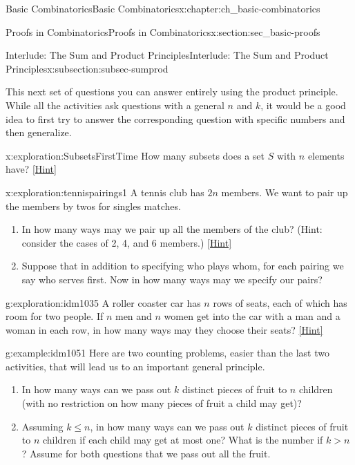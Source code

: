 \documentclass[oneside,10pt,]{book}
\numberwithin{equation}{chapter}
\newcommand{\gt}{>}
\begin{document}
\begin{chapterptx}{Basic Combinatorics}{}{Basic Combinatorics}{}{}{x:chapter:ch_basic-combinatorics}
\begin{sectionptx}{Proofs in Combinatorics}{}{Proofs in Combinatorics}{}{}{x:section:sec_basic-proofs}
\begin{subsectionptx}{Interlude: The Sum and Product Principles}{}{Interlude: The Sum and Product Principles}{}{}{x:subsection:subsec-sumprod}
\par
This next set of questions you can answer entirely using the product principle.  While all the activities ask questions with a general \(n\) and \(k\), it would be a good idea to first try to answer the corresponding question with specific numbers and then generalize.%
\begin{exploration}{}{x:exploration:SubsetsFirstTime}%
How many subsets does a set \(S\) with \(n\) elements have?%
\space\hspace*{0pt}\hfill{\tiny\hyperlink{g:hint:idm1006-back}{[Hint]}}\end{exploration}
\begin{exploration}{}{x:exploration:tennispairings1}%
A tennis club has \(2n\) members. We want to pair up the members by twos for singles matches.%
\begin{enumerate}[font=\bfseries,label=(\alph*),ref=\alph*]
\item{}In how many ways may we pair up all the members of the club? (Hint: consider the cases of 2, 4, and 6 members.)%
\space\hspace*{0pt}\hfill{\tiny\hyperlink{g:hint:idm1023-back}{[Hint]}}\item{}Suppose that in addition to specifying who plays whom, for each pairing we say who serves first.  Now in how many ways may we specify our pairs?%
\end{enumerate}
\end{exploration}
\begin{exploration}{}{g:exploration:idm1035}%
A roller coaster car has \(n\) rows of seats, each of which has room for two people. If \(n\) men and \(n\) women get into the car with a man and a woman in each row, in how many ways may they choose their seats?%
\space\hspace*{0pt}\hfill{\tiny\hyperlink{g:hint:idm1041-back}{[Hint]}}\end{exploration}
\begin{example}{}{g:example:idm1051}%
Here are two counting problems, easier than the last two activities, that will lead us to an important general principle.%
\begin{enumerate}
\item{}In how many ways can we pass out \(k\) distinct pieces of fruit to \(n\) children (with no restriction on how many pieces of fruit a child may get)?%
\item{}Assuming \(k\le n\), in how many ways can we pass out \(k\) distinct pieces of fruit to \(n\) children if each child may get at most one? What is the number if \(k \gt n\)? Assume for both questions that we pass out all the fruit.%

\end{enumerate}
\end{example}
\end{subsectionptx}
\end{sectionptx}
\end{chapterptx}
\end{document}

